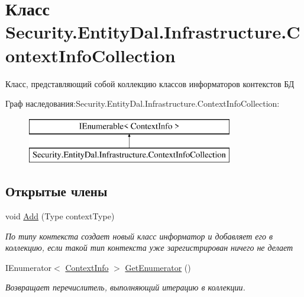 \hypertarget{class_security_1_1_entity_dal_1_1_infrastructure_1_1_context_info_collection}{}\section{Класс Security.\+Entity\+Dal.\+Infrastructure.\+Context\+Info\+Collection}
\label{class_security_1_1_entity_dal_1_1_infrastructure_1_1_context_info_collection}


Класс, представляющий собой коллекцию классов информаторов контекстов БД  


Граф наследования\+:Security.\+Entity\+Dal.\+Infrastructure.\+Context\+Info\+Collection\+:\begin{figure}[H]
\begin{center}
\leavevmode
\includegraphics[height=2.000000cm]{d4/d0f/class_security_1_1_entity_dal_1_1_infrastructure_1_1_context_info_collection}
\end{center}
\end{figure}
\subsection*{Открытые члены}
\begin{DoxyCompactItemize}
\item 
void \hyperlink{class_security_1_1_entity_dal_1_1_infrastructure_1_1_context_info_collection_a44def64b4da0e4d81c8c5c57bcb1a56b}{Add} (Type context\+Type)
\begin{DoxyCompactList}\small\item\em По типу контекста создает новый класс информатор и добавляет его в коллекцию, если такой тип контекста уже зарегистрирован ничего не делает \end{DoxyCompactList}\item 
I\+Enumerator$<$ \hyperlink{class_security_1_1_entity_dal_1_1_infrastructure_1_1_context_info}{Context\+Info} $>$ \hyperlink{class_security_1_1_entity_dal_1_1_infrastructure_1_1_context_info_collection_a0122f69ad29d73953b2ddcff3009c59d}{Get\+Enumerator} ()
\begin{DoxyCompactList}\small\item\em Возвращает перечислитель, выполняющий итерацию в коллекции. \end{DoxyCompactList}\end{DoxyCompactItemize}
